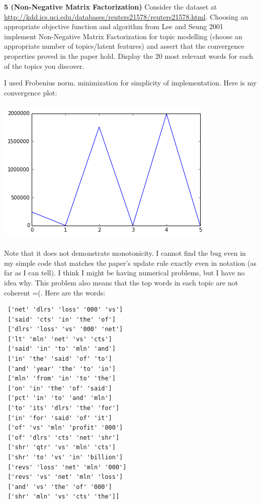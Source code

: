 \documentclass[12pt,letterpaper,fleqn]{hmcpset}
\begin{document}
\newpage

\textbf{5 (Non-Negative Matrix Factorization)} Consider the dataset at
\url{http://kdd.ics.uci.edu/databases/reuters21578/reuters21578.html}. Choosing an appropriate
objective function and algorithm from Lee and Seung 2001
implement Non-Negative Matrix Factorization for topic modelling (choose an appropriate number
of topics/latent features) and assert that the convergence properties proved in the paper hold. 
Display the 20 most relevant words for each of the topics you discover.

I used Frobenius norm. minimization for simplicity of implementation.
Here is my convergence plot:\\\\
\includegraphics[scale = .5]{obj.png}\\\\
Note that it does not demonstrate monotonicity. I cannot find the bug even in my simple code that matches the paper's update rule exactly even in notation (as far as I can tell). I think I might be having numerical problems, but I have no idea why. This problem also means that the top words in each topic are not coherent =(. Here are the words:
\begin{verbatim}
 ['net' 'dlrs' 'loss' '000' 'vs']
 ['said' 'cts' 'in' 'the' 'of']
 ['dlrs' 'loss' 'vs' '000' 'net']
 ['lt' 'mln' 'net' 'vs' 'cts']
 ['said' 'in' 'to' 'mln' 'and']
 ['in' 'the' 'said' 'of' 'to']
 ['and' 'year' 'the' 'to' 'in']
 ['mln' 'from' 'in' 'to' 'the']
 ['on' 'in' 'the' 'of' 'said']
 ['pct' 'in' 'to' 'and' 'mln']
 ['to' 'its' 'dlrs' 'the' 'for']
 ['in' 'for' 'said' 'of' 'it']
 ['of' 'vs' 'mln' 'profit' '000']
 ['of' 'dlrs' 'cts' 'net' 'shr']
 ['shr' 'qtr' 'vs' 'mln' 'cts']
 ['shr' 'to' 'vs' 'in' 'billion']
 ['revs' 'loss' 'net' 'mln' '000']
 ['revs' 'vs' 'net' 'mln' 'loss']
 ['and' 'vs' 'the' 'of' '000']
 ['shr' 'mln' 'vs' 'cts' 'the']]  
\end{verbatim}

\end{document}
